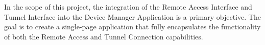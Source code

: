 
In the scope of this project, 
the integration of the Remote Access Interface and Tunnel Interface 
into the Device Manager Application is a primary objective. 
The goal is to create a single-page application 
that fully encapsulates the functionality of both 
the Remote Access and Tunnel Connection capabilities.